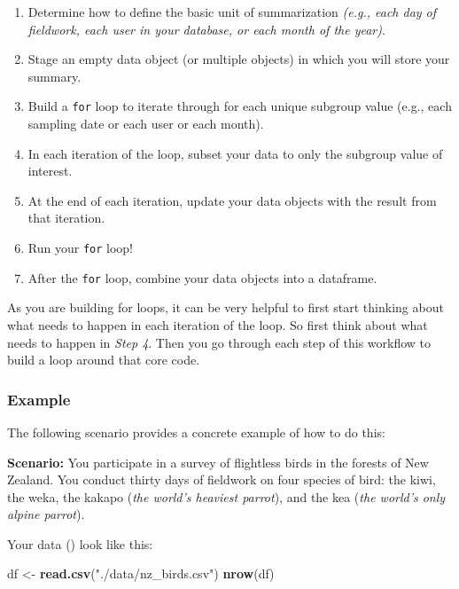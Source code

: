 \documentclass[
]{book}
\newenvironment{Shaded}{\begin{snugshade}}{\end{snugshade}}
\newcommand{\KeywordTok}[1]{\textcolor[rgb]{0.13,0.29,0.53}{\textbf{#1}}}
\newcommand{\NormalTok}[1]{#1}
\newcommand{\StringTok}[1]{\textcolor[rgb]{0.31,0.60,0.02}{#1}}
\begin{document}
\begin{enumerate}
\def\labelenumi{\arabic{enumi}.}
\item
  Determine how to define the basic unit of summarization \emph{(e.g., each day of fieldwork, each user in your database, or each month of the year)}.
\item
  Stage an empty data object (or multiple objects) in which you will store your summary.
\item
  Build a \texttt{for} loop to iterate through for each unique subgroup value (e.g., each sampling date or each user or each month).
\item
  In each iteration of the loop, subset your data to only the subgroup value of interest.
\item
  At the end of each iteration, update your data objects with the result from that iteration.
\item
  Run your \texttt{for} loop!
\item
  After the \texttt{for} loop, combine your data objects into a dataframe.
\end{enumerate}

As you are building for loops, it can be very helpful to first start thinking about what needs to happen in each iteration of the loop. So first think about what needs to happen in \emph{Step 4}. Then you go through each step of this workflow to build a loop around that core code.

\hypertarget{example}{%
\subsubsection*{Example}\label{example}}

The following scenario provides a concrete example of how to do this:

\textbf{Scenario:} You participate in a survey of flightless birds in the forests of New Zealand. You conduct thirty days of fieldwork on four species of bird: the kiwi, the weka, the kakapo (\emph{the world's heaviest parrot}), and the kea (\emph{the world's only alpine parrot}).

Your data () look like this:

\begin{Shaded}
\begin{Highlighting}[]
\NormalTok{df <-}\StringTok{ }\KeywordTok{read.csv}\NormalTok{(}\StringTok{"./data/nz_birds.csv"}\NormalTok{)}
\KeywordTok{nrow}\NormalTok{(df)}
\end{Highlighting}
\end{Shaded}
\end{document}
